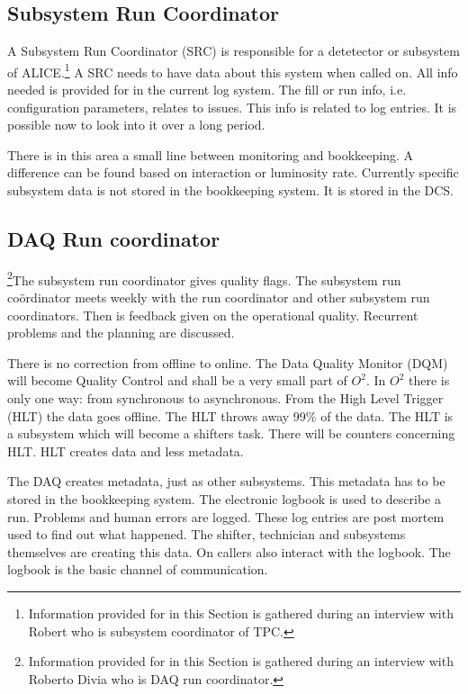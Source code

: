 \subsection{Subsystem Run Coordinator}
A Subsystem Run Coordinator (SRC) is responsible for a detetector or subsystem of ALICE.\footnote{Information provided for in this Section is gathered during an interview with Robert who is subsystem coordinator of TPC.} A SRC needs to have data about this system when called on. All info needed is provided for in the current log system. The fill or run info, i.e. configuration parameters, relates to issues. This info is related to log entries. It is possible now to look into it over a long period.

There is in this area a small line between monitoring and bookkeeping. A difference can be found based on interaction or luminosity rate. Currently specific subsystem data is not stored in the bookkeeping system. It is stored in the DCS.

\subsection{DAQ Run coordinator}
\footnote{Information provided for in this Section is gathered during an interview with Roberto Divia who is DAQ run coordinator.}The subsystem run coordinator gives quality flags. The subsystem run co\"ordinator meets weekly with the run coordinator and other subsystem run coordinators. Then is feedback given on the operational quality. Recurrent problems and the planning are discussed.

There is no correction from offline to online. The Data Quality Monitor (DQM) will become Quality Control and shall be a very small part of $O^2$. In $O^2$ there is only one way: from synchronous to asynchronous. From the High Level Trigger (HLT) the data goes offline. The HLT throws away 99\% of the data. The HLT is a subsystem which will become a shifters task. There will be counters concerning HLT. HLT creates data and less metadata. 

The DAQ creates metadata, just as other subsystems. This metadata has to be stored in the bookkeeping system. The electronic logbook is used to describe a run. Problems and human errors are logged. These log entries are post mortem used to find out what happened. The shifter, technician and subsystems themselves are creating this data. On callers also interact with the logbook. The logbook is the basic channel of communication.


